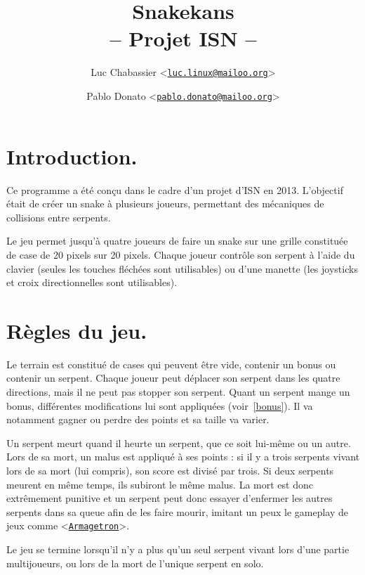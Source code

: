 \documentclass{article}
\title{Snakekans\\-- Projet ISN --}
\author{Luc Chabassier <\href{mailto:luc.linux@mailoo.org}{\nolinkurl{luc.linux@mailoo.org}}> \and Pablo Donato <\href{mailto:pablo.donato@mailoo.org}{\nolinkurl{pablo.donato@mailoo.org}}>}
\begin{document}
\maketitle

\tableofcontents

\section{Introduction.}
Ce programme a été conçu dans le cadre d'un projet d'ISN en 2013. L'objectif était de créer un snake à plusieurs joueurs, permettant des mécaniques de collisions entre serpents.

Le jeu permet jusqu'à quatre joueurs de faire un snake sur une grille constituée de case de 20 pixels sur 20 pixels. Chaque joueur contrôle son serpent à l'aide du clavier (seules les touches fléchées sont utilisables) ou d'une manette (les joysticks et croix directionnelles sont utilisables).

\section{Règles du jeu.}
Le terrain est constitué de cases qui peuvent être vide, contenir un bonus ou contenir un serpent. Chaque joueur peut déplacer son serpent dans les quatre directions, mais il ne peut pas stopper son serpent. Quant un serpent mange un bonus, différentes modifications lui sont appliquées (voir~\ref{bonus}). Il va notamment gagner ou perdre des points et sa taille va varier.

Un serpent meurt quand il heurte un serpent, que ce soit lui-même ou un autre. Lors de sa mort, un malus est appliqué à ses points : si il y a trois serpents vivant lors de sa mort (lui compris), son score est divisé par trois. Si deux serpents meurent en même temps, ils subiront le même malus. La mort est donc extrêmement punitive et un serpent peut donc essayer d'enfermer les autres serpents dans sa queue afin de les faire mourir, imitant un peux le gameplay de jeux comme <\href{http://armagetronad.org}{\nolinkurl{Armagetron}}>.

Le jeu se termine lorsqu'il n'y a plus qu'un seul serpent vivant lors d'une partie multijoueurs, ou lors de la mort de l'unique serpent en solo.
\end{document}
